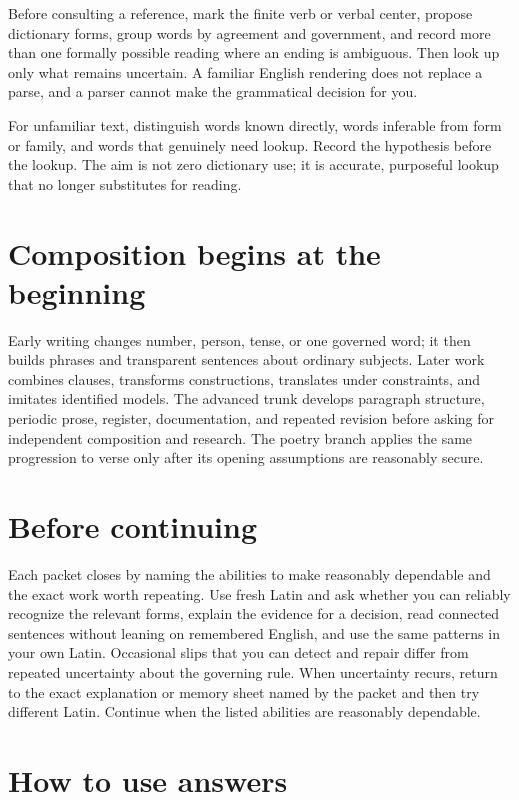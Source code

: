 Before consulting a reference, mark the finite verb or verbal center, propose
dictionary forms, group words by agreement and government, and record more
than one formally possible reading where an ending is ambiguous. Then look up
only what remains uncertain. A familiar English rendering does not replace a
parse, and a parser cannot make the grammatical decision for you.

For unfamiliar text, distinguish words known directly, words inferable from
form or family, and words that genuinely need lookup. Record the hypothesis
before the lookup. The aim is not zero dictionary use; it is accurate,
purposeful lookup that no longer substitutes for reading.

\section{Composition begins at the beginning}

Early writing changes number, person, tense, or one governed word; it then
builds phrases and transparent sentences about ordinary subjects. Later work
combines clauses, transforms constructions, translates under constraints, and
imitates identified models. The advanced trunk develops paragraph structure,
periodic prose, register, documentation, and repeated revision before asking
for independent composition and research. The poetry branch applies the same
progression to verse only after its opening assumptions are reasonably secure.

\section{Before continuing}

Each packet closes by naming the abilities to make reasonably dependable and
the exact work worth repeating. Use fresh Latin and ask whether you can
reliably recognize the relevant forms, explain the evidence for a decision,
read connected sentences without leaning
on remembered English, and use the same patterns in your own Latin.
Occasional slips that you can detect and repair differ from repeated
uncertainty about the governing rule. When uncertainty recurs, return to the
exact explanation or memory sheet named by the packet and then try different
Latin. Continue when the listed abilities are reasonably dependable.

\section{How to use answers}


